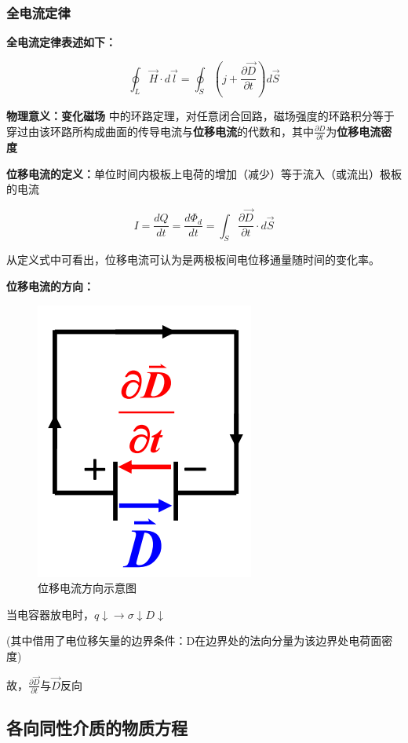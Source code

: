 \documentclass{ctexart}
\begin{document}
\subsubsection{全电流定律}

\textbf{全电流定律表述如下：}

$$\oint_L \vec{H}·d\vec{l}=\oint_S (j+\frac{\partial\vec{D}}{\partial t})d\vec{S}$$

\textbf{物理意义：变化磁场} 中的环路定理，对任意闭合回路，磁场强度的环路积分等于
穿过由该环路所构成曲面的传导电流与\textbf{位移电流}的代数和，其中$\frac{
	\partial D}{\partial t}$为\textbf{位移电流密度}

\textbf{位移电流的定义：}单位时间内极板上电荷的增加（减少）等于流入（或流出）极板的电流

$$I=\frac{dQ}{dt}=\frac{d\Phi_d}{dt}=\int_S\frac{\partial \vec{D}}{
\partial t}·d\vec{S}$$

从定义式中可看出，位移电流可认为是两极板间电位移通量随时间的变化率。

\textbf{位移电流的方向：}

\begin{figure}[h]
	\centering
	\includegraphics[scale=0.3]{images//chapter_14//figure_14.3.jpg} 
	\caption{位移电流方向示意图}\label{figure14.3}
\end{figure}

当电容器放电时，$q\downarrow\rightarrow\sigma\downarrow D\downarrow$

(其中借用了电位移矢量的边界条件：D在边界处的法向分量为该边界处电荷面密度)

故，$\frac{\partial\vec{D}}{\partial t}$与$\vec{D}$反向

\subsection{各向同性介质的物质方程}
\end{document}
